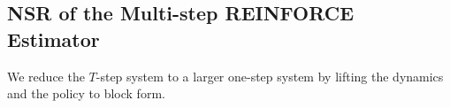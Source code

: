 
\subsection{NSR of the Multi-step REINFORCE Estimator}\label{sec:multi-step-lqg}

We reduce the \(T\)-step system to a larger one-step system by lifting the dynamics and the policy to block form.


